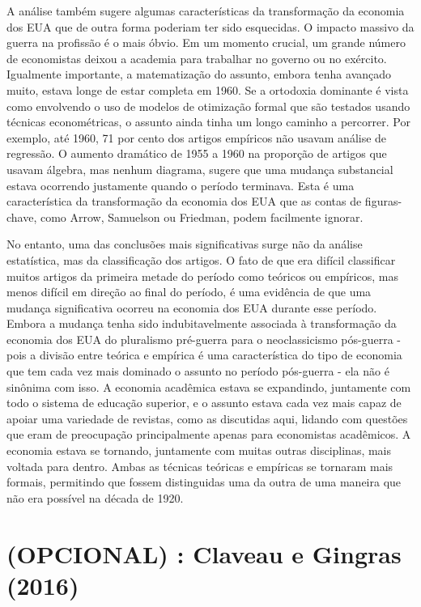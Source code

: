 \documentclass[12pt]{article}
\begin{document}
A análise também sugere algumas características da transformação da economia dos EUA que de outra forma poderiam ter sido esquecidas. O impacto massivo da guerra na profissão é o mais óbvio. Em um momento crucial, um grande número de economistas deixou a academia para trabalhar no governo ou no exército. Igualmente importante, a matematização do assunto, embora tenha avançado muito, estava longe de estar completa em 1960. Se a ortodoxia dominante é vista como envolvendo o uso de modelos de otimização formal que são testados usando técnicas econométricas, o assunto ainda tinha um longo caminho a percorrer. Por exemplo, até 1960, 71 por cento dos artigos empíricos não usavam análise de regressão. O aumento dramático de 1955 a 1960 na proporção de artigos que usavam álgebra, mas nenhum diagrama, sugere que uma mudança substancial estava ocorrendo justamente quando o período terminava. Esta é uma característica da transformação da economia dos EUA que as contas de figuras-chave, como Arrow, Samuelson ou Friedman, podem facilmente ignorar.

No entanto, uma das conclusões mais significativas surge não da análise estatística, mas da classificação dos artigos. O fato de que era difícil classificar muitos artigos da primeira metade do período como teóricos ou empíricos, mas menos difícil em direção ao final do período, é uma evidência de que uma mudança significativa ocorreu na economia dos EUA durante esse período. Embora a mudança tenha sido indubitavelmente associada à transformação da economia dos EUA do pluralismo pré-guerra para o neoclassicismo pós-guerra - pois a divisão entre teórica e empírica é uma característica do tipo de economia que tem cada vez mais dominado o assunto no período pós-guerra - ela não é sinônima com isso. A economia acadêmica estava se expandindo, juntamente com todo o sistema de educação superior, e o assunto estava cada vez mais capaz de apoiar uma variedade de revistas, como as discutidas aqui, lidando com questões que eram de preocupação principalmente apenas para economistas acadêmicos. A economia estava se tornando, juntamente com muitas outras disciplinas, mais voltada para dentro. Ambas as técnicas teóricas e empíricas se tornaram mais formais, permitindo que fossem distinguidas uma da outra de uma maneira que não era possível na década de 1920.


\section{\textbf{(OPCIONAL) : Claveau e Gingras (2016)}}
\end{document}

